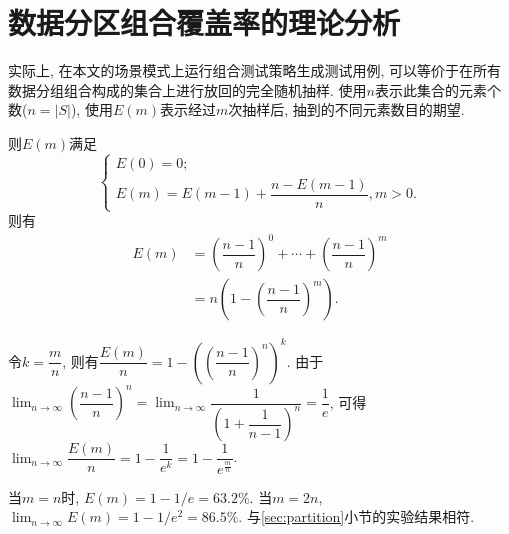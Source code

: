 \chapter{数据分区组合覆盖率的理论分析}
    \label{sec:partition_deduction}
    
    实际上, 在本文的场景模式上运行组合测试策略生成测试用例, 可以等价于在所有数据分组组合构成的集合上进行放回的完全随机抽样. 使用$n$表示此集合的元素个数($n = |S|$), 使用$E(m)$表示经过$m$次抽样后, 抽到的不同元素数目的期望.
    
    则$E(m)$满足
    \begin{equation}
        \left\{
        \begin{array}{l}
             E(0) = 0; \\
             E(m) = E(m-1) + \dfrac{n - E(m-1)}{n}, m > 0.
        \end{array}
        \right.
    \end{equation}
    则有
    \begin{equation}
        \begin{aligned}
        	E(m) & =\left(\dfrac{n-1}{n}\right)^{0} + \cdots + \left(\dfrac{n-1}{n}\right)^{m} \\
            & = n\left(1-(\dfrac{n-1}{n})^{m}\right).
    	\end{aligned}
    \end{equation}
    
    令$k = \dfrac{m}{n}$, 则有$\dfrac{E(m)}{n} = 1 - \left((\dfrac{n-1}{n})^n\right)^k$. 由于$\lim_{n\to\infty} \left(\dfrac{n-1}{n}\right)^n = \lim_{n\to\infty} \dfrac{1}{\left(1+\dfrac{1}{n-1}\right)^n} = \dfrac{1}{e}$, 可得$\lim_{n\to\infty}\dfrac{E(m)}{n} = 1 - \dfrac{1}{e^{k}} = 1 - \dfrac{1}{e^\frac{m}{n}}$.
    
    当$m=n$时, $E(m) = 1 - 1 / e = 63.2\%$. 当$m=2n$, $\lim_{n\to\infty} E(m) = 1 - 1 / e^2 = 86.5\%$. 与\ref{sec:partition}小节的实验结果相符.